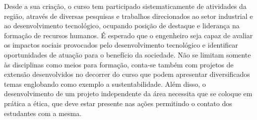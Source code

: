 Desde a sua criação, o curso tem participado sistematicamente de atividades da região, através de diversas pesquisas e trabalhos direcionados ao setor industrial e ao desenvolvimento tecnológico, ocupando posição de destaque e liderança na formação de recursos humanos. É esperado que o engenheiro seja capaz de avaliar os impactos sociais provocados pelo desenvolvimento tecnológico e identificar oportunidades de atuação para o benefício da sociedade. Não se limitam somente às disciplinas como meios para formação, conta-se também com projetos de extensão desenvolvidos no decorrer do curso que podem apresentar diversificados temas englobando como exemplo a sustentabilidade.  Além disso, o desenvolvimento de um projeto independente da área necessita que se coloque em prática a ética, que deve estar presente nas ações permitindo o contato dos estudantes com a mesma.
